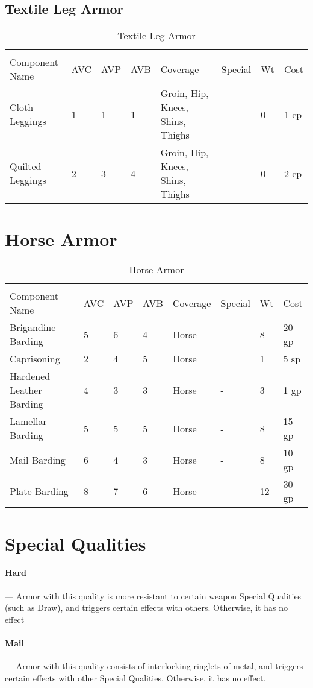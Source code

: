 \documentclass[oneside,11pt,english]{book}
\begin{document}
\subsection{Textile Leg Armor}
\begin{longtabu}to 
  \captionsetup{textformat=empty, labelformat=blank}
  \caption{Textile Leg Armor} \vspace{-15pt}
  \label{tab:Textile Leg Armor}\\
  Component Name&AVC&AVP&AVB& Coverage& Special& Wt&Cost\\\toprule
  Cloth Leggings& 1& 1& 1& Groin, Hip, Knees, 
  Shins, Thighs& & 0& 1 cp\\
  Quilted Leggings& 2& 3& 4& Groin, Hip, Knees, 
  Shins, Thighs& & 0& 2 cp\\
\end{longtabu}

\section{Horse Armor}
\begin{longtabu} to 
  \captionsetup{textformat=empty, labelformat=blank}
  \caption{Horse Armor} \vspace{-15pt}
  \label{tab:Horse Armor}\\
  Component Name&AVC&AVP&AVB& Coverage& Special& Wt&Cost\\\toprule
  Brigandine 
  Barding& 5& 6& 4& Horse& -& 8& 20 gp\\
  Caprisoning& 2& 4& 5& Horse& & 1& 5 sp\\
  Hardened Leather Barding& 4& 3& 3& Horse& -& 3& 1 gp\\
  Lamellar Barding& 5& 5& 5& Horse& -& 8& 15 gp\\
  Mail Barding& 6& 4& 3& Horse& -& 8& 10 gp\\
  Plate Barding& 8& 7& 6& Horse& -& 12& 30 gp\\
\end{longtabu}

\section{Special Qualities}
\paragraph{\label{par:Hard}Hard}---\quad
Armor with this quality is more resistant to certain weapon Special Qualities
(such as Draw), and triggers certain effects with others. Otherwise, it has no
effect 
\vspace*{-10pt}\paragraph{\label{par:Mail}Mail}---\quad
Armor with this quality consists of interlocking ringlets of metal, and triggers
certain effects with other Special Qualities. Otherwise, it has no effect. 
\end{document}
